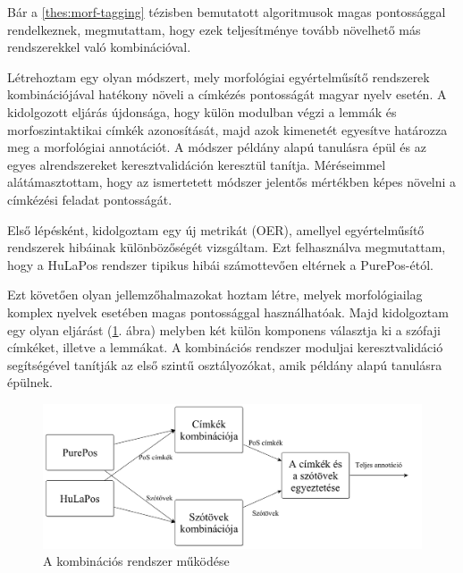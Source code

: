 \thesisline%


Bár a \ref{thes:morf-tagging} tézisben bemutatott algoritmusok magas pontossággal rendelkeznek, megmutattam, hogy ezek teljesítménye tovább növelhető más rendszerekkel való kombinációval. 

\begin{core}
\begin{thesis}
Létrehoztam egy olyan módszert, mely morfológiai egyértelműsítő rendszerek kombinációjával hatékony növeli a címkézés pontosságát magyar nyelv esetén.
A kidolgozott eljárás újdonsága, hogy külön modulban végzi a lemmák és morfoszintaktikai címkék azonosítását, majd azok kimenetét egyesítve határozza meg a morfológiai annotációt.
A módszer példány alapú tanulásra épül és az egyes alrendszereket keresztvalidáción keresztül tanítja.
Méréseimmel alátámasztottam, hogy az ismertetett módszer jelentős mértékben képes növelni a címkézési feladat pontosságát. 
\end{thesis}

\begin{pub}
\cite{Laki2013a,Orosz2013c,Orosz2013d} 
\end{pub}
\end{core}

Első lépésként, kidolgoztam egy új metrikát (OER), amellyel egyértelműsítő rendszerek hibáinak különbözőségét vizsgáltam. 
Ezt felhasználva megmutattam, hogy a HuLaPos rendszer tipikus hibái számottevően eltérnek a PurePos-étól. 

Ezt követően olyan jellemzőhalmazokat hoztam létre, melyek morfológiailag komplex nyelvek esetében magas pontossággal használhatóak.
Majd kidolgoztam egy olyan eljárást (\ref{fig:comb3_en}. ábra) melyben két külön komponens választja ki a szófaji címkéket, illetve a lemmákat. 
A kombinációs rendszer moduljai keresztvalidáció segítségével tanítják az első szintű osztályozókat, amik példány alapú tanulásra épülnek.

\begin{figure}[H]
  \centering %
  \includegraphics[scale=0.15]{MorphTagging/comb3_hu.png} 
  \caption{A kombinációs rendszer működése}
  \label{fig:comb3_en}
\end{figure}

